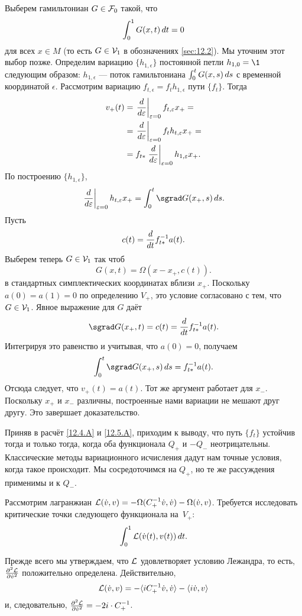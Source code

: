 Выберем гамильтониан $G\in\mathcal{F}_0$ такой, что
\[\int_0^1G(x, t)\,d t = 0\]
для всех $x\in M$ (то есть $G\in\mathcal{V}_1$ в обозначениях \ref{sec:12.2}).
Мы уточним этот выбор позже.
Определим вариацию $\{h_{1,\epsilon}\}$ постоянной петли $h_{1,0} =
\1$ следующим образом: $h_{1,\epsilon}$ — поток гамильтониана
$\int_0^tG(x,s)\,d s$ с временной координатой $\epsilon$. 
Рассмотрим вариацию $f_{t,\epsilon} = f_th_{1,\epsilon}$ пути $\{f_t\}$.
Тогда
\begin{align*}
v_+(t) &= \left.\frac{d}{d \varepsilon}\right|_{\varepsilon=0} f_{t,\varepsilon} x_+ =
\\
&=\left.\frac{d}{d \varepsilon}\right|_{\varepsilon=0}f_th_{t,\varepsilon} x_+=
\\
&=
f_{t*} \left.\frac{d}{d \varepsilon}\right|_{\varepsilon=0} h_{1,\varepsilon} x_+.
\end{align*}
По построению $\{h_{1,\epsilon}\}$,
\[\left.\frac{\d}{\d \epsilon}\right|_{\epsilon=0}h_{t,\epsilon}x_+
=
\int_0^t\sgrad G(x_+,s)\,\d s.\]
Пусть 
\[c(t) = \frac{d}{d t}f^{-1}_{t*} a(t).\]
Выберем теперь $G \in \mathcal{V}_1$ так чтоб 
\[G(x, t) = \Omega(x - x_+, c(t)).\]
в стандартных симплектических координатах вблизи $x_+$.
Поскольку $a(0) = a(1) = 0$ по определению $V_+$, это условие
согласовано с тем, что $G\in\mathcal{V}_1$. 
Явное выражение для $G$ даёт 
\[\sgrad G(x_+, t) = c(t) = \frac{\d}{\d t}f^{-1}_{t*} a(t).\]
Интегрируя это равенство и учитывая, что $a(0) = 0$, получаем
\[\int_0^t\sgrad G(x_+, s)\,\d s = f_{t*}^{-1}a(t).\]
Отсюда следует, что $v_+(t) = a(t)$.
Тот же аргумент работает для $x_-$.
Поскольку $x_+$ и $x_-$ различны, построенные нами вариации не мешают
друг другу. 
Это завершает доказательство.
\qeds

Приняв в расчёт \ref{12.4.A} и \ref{12.5.A}, приходим к выводу, что
путь $\{f_t\}$ устойчив тогда и только тогда, когда оба
функционала $Q_+$ и $-Q_-$ неотрицательны. 
Классические методы вариационного исчисления дадут нам точные условия,
когда такое происходит. 
Мы сосредоточимся на $Q_+$, но те же рассуждения применимы и к $Q_-$.

Рассмотрим лагранжиан $\mathcal{L}(\dot v, v) = -\Omega(C_+^{-1}\dot v, \dot v)
- \Omega(\dot v, v)$. 
Требуется исследовать критические точки следующего функционала на~$V_+$:
\[\int_0^1 \mathcal{L}(\dot v(t), v(t))\,d t.\]

Прежде всего мы утверждаем, что $\mathcal{L}$ удовлетворяет условию Лежандра,
то есть, $\tfrac{\partial^2\mathcal{L}}{\partial\dot v^2}$ положительно
определена. 
Действительно, 
\[\mathcal{L}( \dot v, v) = -\langle iC_+^{-1} \dot v,\dot v\rangle - \langle i\dot v, v\rangle\]
и, следовательно, $\tfrac{\partial^2\mathcal{L}}{\partial\dot v^2}= - 2i\cdot C_+^{-1}$.

